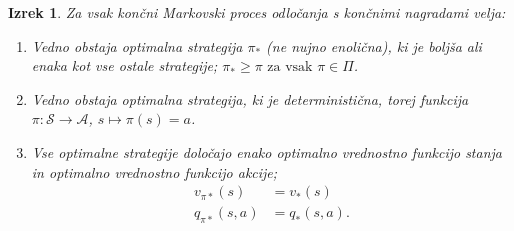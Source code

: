 \documentclass[12pt,a4paper]{amsart}
\theoremstyle{definition} %
\theoremstyle{plain} %
\newtheorem{izrek}[definicija]{Izrek}
\begin{document}
\begin{izrek}\label{optim}
    Za vsak končni Markovski proces odločanja s končnimi nagradami velja: 
    \begin{enumerate}
        \item Vedno obstaja \textit{optimalna} strategija $\pi_*$ (ne nujno enolična), ki je boljša 
                ali enaka kot vse ostale strategije; $\pi_* \geq \pi \text{ za vsak }  \pi \in \Pi$. 
        
        \item Vedno obstaja optimalna strategija, ki je \textit{deterministična}, torej funkcija  
                $\pi: \mathcal{S} \rightarrow \mathcal{A}$, $s \mapsto \pi(s) = a$.

        \item Vse optimalne strategije določajo enako optimalno vrednostno funkcijo stanja in 
                optimalno vrednostno funkcijo akcije; 
                \begin{align*}
                    v_{\pi*}(s) &= v_*(s) \\
                    q_{\pi*}(s, a) &= q_*(s, a).
                \end{align*}
    \end{enumerate} 
\end{izrek}
\end{document}
